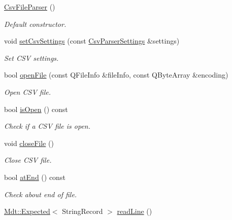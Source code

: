 \begin{DoxyCompactItemize}
\item 
\hyperlink{class_mdt_1_1_plain_text_1_1_csv_file_parser_ac7913634006a58b5a5c2b53a3de21a57}{Csv\+File\+Parser} ()
\begin{DoxyCompactList}\small\item\em Default constructor. \end{DoxyCompactList}\item 
void \hyperlink{class_mdt_1_1_plain_text_1_1_csv_file_parser_ae5a305689ca8b7aaee94f51b95464135}{set\+Csv\+Settings} (const \hyperlink{class_mdt_1_1_plain_text_1_1_csv_parser_settings}{Csv\+Parser\+Settings} \&settings)
\begin{DoxyCompactList}\small\item\em Set C\+SV settings. \end{DoxyCompactList}\item 
bool \hyperlink{class_mdt_1_1_plain_text_1_1_csv_file_parser_a9b81b6061eb86888af9fe51752f8617a}{open\+File} (const Q\+File\+Info \&file\+Info, const Q\+Byte\+Array \&encoding)
\begin{DoxyCompactList}\small\item\em Open C\+SV file. \end{DoxyCompactList}\item 
bool \hyperlink{class_mdt_1_1_plain_text_1_1_csv_file_parser_a2e8e57b7cd46bccf4c6953b9654c73fa}{is\+Open} () const 
\begin{DoxyCompactList}\small\item\em Check if a C\+SV file is open. \end{DoxyCompactList}\item 
void \hyperlink{class_mdt_1_1_plain_text_1_1_csv_file_parser_aee81b90521927b6f8eb1482633c0a67d}{close\+File} ()
\begin{DoxyCompactList}\small\item\em Close C\+SV file. \end{DoxyCompactList}\item 
bool \hyperlink{class_mdt_1_1_plain_text_1_1_csv_file_parser_af71b58865205fac3eebd00b416f58a2f}{at\+End} () const 
\begin{DoxyCompactList}\small\item\em Check about end of file. \end{DoxyCompactList}\item 
\hyperlink{class_mdt_1_1_expected}{Mdt\+::\+Expected}$<$ String\+Record $>$ \hyperlink{class_mdt_1_1_plain_text_1_1_csv_file_parser_ab0b04108ed3e2ea4fa272567d7bed2ed}{read\+Line} ()

\end{DoxyCompactItemize}
